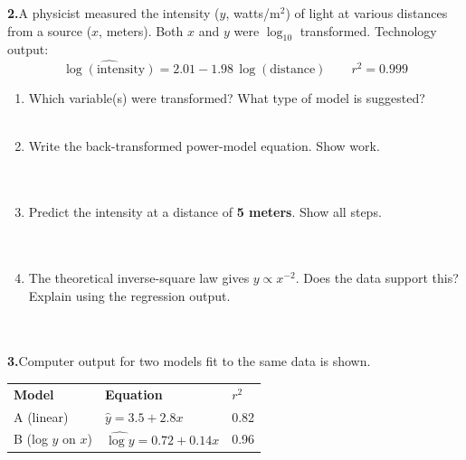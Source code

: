 \documentclass[10pt]{article}
\begin{document}
\vspace{0.18in}

\noindent\textbf{2.}\enspace A physicist measured the intensity ($y$, watts/m$^2$) of light
at various distances from a source ($x$, meters). Both $x$ and $y$ were $\log_{10}$
transformed. Technology output:
\[
  \widehat{\log(\text{intensity})} = 2.01 - 1.98\,\log(\text{distance}) \qquad r^2 = 0.999
\]

\begin{enumerate}[label=\textbf{(\alph*)}, leftmargin=2em, itemsep=0.18in]

  \item Which variable(s) were transformed? What type of model is suggested?\\[8pt]
        \writeline\\[3pt]\writeline

  \item Write the back-transformed power-model equation. Show work.\\[8pt]
        \writeline\\[3pt]\writeline\\[3pt]\writeline

  \item Predict the intensity at a distance of \textbf{5 meters}. Show all steps.\\[8pt]
        \writeline\\[3pt]\writeline\\[3pt]\writeline

  \item The theoretical inverse-square law gives $y \propto x^{-2}$. Does the data support
        this? Explain using the regression output.\\[8pt]
        \writeline\\[3pt]\writeline\\[3pt]\writeline

\end{enumerate}

\vspace{0.18in}

\noindent\textbf{3.}\enspace Computer output for two models fit to the same data is shown.

\vspace{8pt}
\renewcommand{\arraystretch}{1.4}
\begin{tabularx}{\linewidth}{@{} l X X @{}}
\rowcolor{sky} \textbf{Model} & \textbf{Equation} & \textbf{$r^2$} \\
A (linear) & $\hat{y} = 3.5 + 2.8x$ & 0.82 \\
B (log $y$ on $x$) & $\widehat{\log y} = 0.72 + 0.14x$ & 0.96 \\
\end{tabularx}
\end{document}
